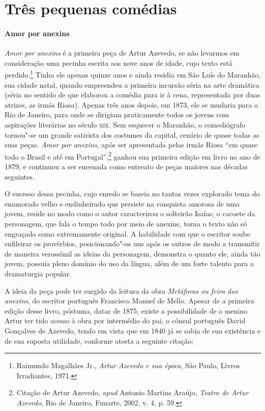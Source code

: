 \section{Três pequenas comédias}

\paragraph{Amor por anexins}
\textit{Amor por anexins} é a primeira peça de Artur Azevedo, se não
levarmos em consideração uma pecinha escrita aos nove anos de idade,
cujo texto está perdido.\footnote{ Raimundo Magalhães Jr.,
\textit{Artur Azevedo e sua época}, São Paulo, Livros
Irradiantes, 1971.} Tinha ele apenas quinze anos e ainda residia
em São Luís do Maranhão, sua cidade natal, quando empreendeu a primeira
incursão séria na arte dramática (séria no sentido de que elaborou
a comédia para ir à cena, representada por duas atrizes, as irmãs
Riosa). Apenas três anos depois, em 1873, ele se mudaria para o Rio de
Janeiro, para onde se dirigiam praticamente todos os jovens com
aspirações literárias no século \textsc{xix}. Sem esquecer o Maranhão, o
comediógrafo tornou"-se um grande satirista dos costumes da capital,
cenário de quase todas as suas peças. \textit{Amor por anexins}, após
ser apresentada pelas irmãs Riosa “em quase todo o Brasil e até em
Portugal”,\footnote{ Citação de Artur Azevedo, \textit{apud } Antonio Martins Araújo, \textit{Teatro de Artur Azevedo}, Rio de Janeiro, Funarte, 2002, v. 4, p. 59.} ganhou sua primeira edição em livro no
ano de 1879, e continuou a ser encenada como entreato de peças maiores
nas décadas seguintes. 

O sucesso dessa pecinha, cujo enredo se baseia no tantas vezes explorado
tema do enamorado velho e endinheirado que persiste na conquista
amorosa de uma jovem, reside no modo como o autor caracterizou o
solteirão Isaías; o cacoete da personagem, que fala o tempo todo por
meio de anexins, torna o texto não só engraçado como extremamente
original. A habilidade com que o escritor soube enfileirar os
provérbios, posicionando"-os uns após os outros de modo a transmitir de
maneira verossímil as ideias da personagem, demonstra o quanto ele,
ainda tão jovem, possuía pleno domínio do uso da língua, além de um forte
talento para a dramaturgia popular. 

A ideia da peça pode ter surgido da leitura da obra \textit{Metáforas ou
feira dos anexins}, do escritor português Francisco Manuel de Mello.
Apesar de a primeira edição desse livro, póstuma, datar de 1875, existe
a possibilidade de o menino Artur ter tido acesso à obra por intermédio
do pai, o cônsul português David Gonçalves de Azevedo, tendo em vista
que em 1840 já se sabia de sua existência e de sua suposta utilidade,
conforme atesta a seguinte citação:

